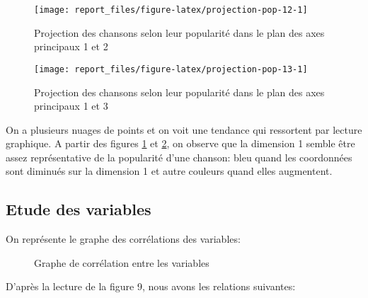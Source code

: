 \documentclass[
  11pt,
  xcolor = usenames,dvipsnames]{article}
\begin{document}
\begin{figure}

{\centering \texttt{[image: report\_files/figure-latex/projection-pop-12-1]} 

}

\caption{Projection des chansons selon leur popularité dans le plan des axes principaux 1 et 2}\label{fig:projection-pop-12}
\end{figure}
\begin{figure}

{\centering \texttt{[image: report\_files/figure-latex/projection-pop-13-1]} 

}

\caption{Projection des chansons selon leur popularité dans le plan des axes principaux 1 et 3}\label{fig:projection-pop-13}
\end{figure}

On a plusieurs nuages de points et on voit une tendance qui ressortent par lecture graphique. A partir des figures
\ref{fig:projection-pop-12} et \ref{fig:projection-pop-13}, on observe que la dimension 1 semble être assez représentative de la popularité d'une chanson:
bleu quand les coordonnées sont diminués sur la dimension 1 et autre couleurs quand elles augmentent.

\hypertarget{etude-des-variables}{%
\subsection{Etude des variables}\label{etude-des-variables}}

On représente le graphe des corrélations des variables:

\begin{figure}

{\centering {}

}

\caption{Graphe de corrélation entre les variables}\label{fig:corvar-acp-12}
\end{figure}

D'après la lecture de la figure 9, nous avons les relations suivantes:
\end{document}
